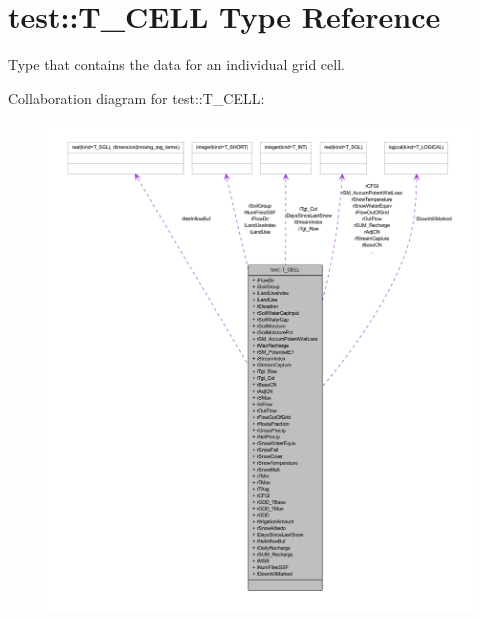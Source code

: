 \hypertarget{typetest_1_1_t___c_e_l_l}{
\section{test::T\_\-CELL Type Reference}
\label{typetest_1_1_t___c_e_l_l}
}


Type that contains the data for an individual grid cell.  




Collaboration diagram for test::T\_\-CELL:\nopagebreak
\begin{figure}[H]
\begin{center}
\leavevmode
\includegraphics[width=400pt]{typetest_1_1_t___c_e_l_l__coll__graph}
\end{center}
\end{figure}
